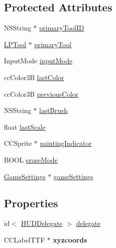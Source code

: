 \subsection*{Protected Attributes}
\begin{DoxyCompactItemize}
\item 
N\-S\-String $\ast$ \hyperlink{interface_h_u_d_layer_aae17304a5ecff2a6fa43471edb779341}{primary\-Tool\-I\-D}
\item 
\hyperlink{interface_l_p_tool}{L\-P\-Tool} $\ast$ \hyperlink{interface_h_u_d_layer_aad9b0e2b4164986e18ea0a9afcd1a914}{primary\-Tool}
\item 
Input\-Mode \hyperlink{interface_h_u_d_layer_a1e506792d581032644d75804beb359a7}{input\-Mode}
\item 
cc\-Color3\-B \hyperlink{interface_h_u_d_layer_a2d27bf64876ea6f0b2f0d1b9013c1cd7}{last\-Color}
\item 
cc\-Color3\-B \hyperlink{interface_h_u_d_layer_a2b737d7aa3b728dd3d5990ef4cb68f29}{previous\-Color}
\item 
N\-S\-String $\ast$ \hyperlink{interface_h_u_d_layer_ad7cb8a30419241ee8d2f2813031191be}{last\-Brush}
\item 
float \hyperlink{interface_h_u_d_layer_aedd1d8d2b2d31e203c3242d09390b561}{last\-Scale}
\item 
C\-C\-Sprite $\ast$ \hyperlink{interface_h_u_d_layer_a67d356e56a82f871b6c5de5818c5985d}{painting\-Indicator}
\item 
B\-O\-O\-L \hyperlink{interface_h_u_d_layer_aa1df984387a5f884acf38a7d733d6432}{erase\-Mode}
\item 
\hyperlink{interface_game_settings}{Game\-Settings} $\ast$ \hyperlink{interface_h_u_d_layer_a69515b3bf7bddc07e65bad3eaa4a2e7a}{game\-Settings}
\end{DoxyCompactItemize}
\subsection*{Properties}
\begin{DoxyCompactItemize}
\item 
id$<$ \hyperlink{protocol_h_u_d_delegate-p}{H\-U\-D\-Delegate} $>$ \hyperlink{interface_h_u_d_layer_a64cb26c1f8c5a76e8f392a02291c0cf6}{delegate}
\item 
\hypertarget{interface_h_u_d_layer_ae0974aa467c08003e700e3d538f282c0}{C\-C\-Label\-T\-T\-F $\ast$ {\bfseries xyzcoords}}\label{d3/d8a/interface_h_u_d_layer_ae0974aa467c08003e700e3d538f282c0}

\end{DoxyCompactItemize}


